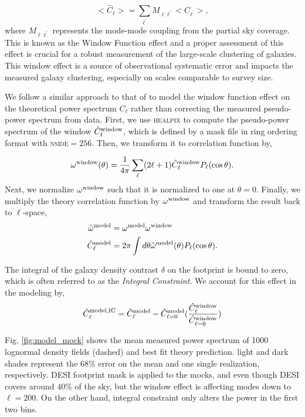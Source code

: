 \begin{equation}
    <\hat{C}_{\ell}> = \sum_{\ell^{\prime}} M_{\ell \ell^{\prime}}<C_{\ell^{\prime}}>,
\end{equation}
where $M_{\ell \ell^{\prime}}$ represents the mode-mode coupling from the partial sky coverage. This is known as the Window Function effect and a proper assessment of this effect is crucial for a robust measurement of the large-scale clustering of galaxies. This window effect is a source of observational systematic error and impacts the measured galaxy clustering, especially on scales comparable to survey size.

We follow a similar approach to that of \citep{chon2004MNRAS.350..914C} to model the window function effect on the theoretical power spectrum $C_{\ell}$ rather than correcting the measured pseudo-power spectrum from data. First, we use \textsc{healpix} to compute the pseudo-power spectrum of the window $\hat{C}^{\rm window}_{\ell}$, which is defined by a mask file in ring ordering format with \textsc{nside}$=256$. Then, we transform it to correlation function by,

\begin{equation}
    \omega^{\rm window} (\theta) = \frac{1}{4\pi}\sum_{\ell} (2\ell+1) \hat{C}^{\rm window}_{\ell} P_{\ell}(\cos \theta).
\end{equation}
Next, we normalize $\omega^{\rm window}$ such that it is normalized to one at $\theta=0$. Finally, we multiply the theory correlation function by $\omega^{\rm window}$ and transform the result back to $\ell$-space,%
\begin{align}
    \hat{\omega}^{\rm model} &= \omega^{\rm model} \omega^{\rm window} \\
    \hat{C}^{\rm model}_{\ell} &= 2\pi \int d\theta \hat{\omega}^{\rm model}(\theta)P_{\ell}(\cos \theta).
\end{align}

The integral of the galaxy density contrast $\delta$ on the footprint is bound to zero, which is often referred to as the \textit{Integral Constraint}. We account for this effect in the modeling by,
\begin{equation}
     \hat{C}^{\rm model, IC}_{\ell} = \hat{C}^{\rm model}_{\ell} - \hat{C}^{\rm model}_{\ell=0} (\frac{\hat{C}^{\rm window}_{\ell}}{\hat{C}^{\rm window}_{\ell=0}})
\end{equation}

Fig. \ref{fig:model_mock} shows the mean measured power spectrum of 1000 lognormal density fields (dashed) and best fit theory prediction. light and dark shades represent the 68\% error on the mean and one single realization, respectively. DESI footprint mask is applied to the mocks, and even though DESI covers around $40\%$ of the sky, but the window effect is affecting modes down to $\ell=200$. On the other hand, integral constraint only alters the power in the first two bins. 

